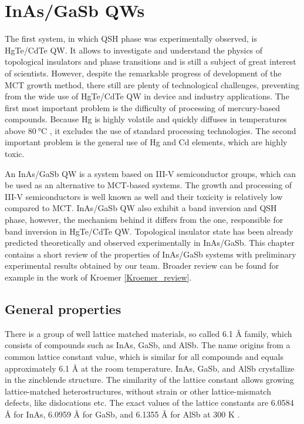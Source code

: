 \documentclass[titlepage,a4paper]{book}
\newcommand{\wciecie}{\quad\phantom{v}}
\begin{document}
\chapter{InAs/GaSb QWs}
\label{Appendix_InAs}
\wciecie
The first system, in which QSH phase was experimentally observed, is HgTe/CdTe QW. It allows to investigate and understand the physics of topological insulators and phase transitions and is still a subject of great interest of scientists. However, despite the remarkable progress of development of the MCT growth method, there still are plenty of technological challenges, preventing from the wide use of HgTe/CdTe QW in device and industry applications. The first most important problem is the difficulty of processing of mercury-based compounds. Because Hg is highly volatile and quickly diffuses in temperatures above $\SI{80}{\degreeCelsius}$ \cite{Daumer_MCT_temperature}, it excludes the use of standard processing technologies. The second important problem is the general use of Hg and Cd elements, which are highly toxic.

An InAs/GaSb QW is a system based on III-V semiconductor groups, which can be used as an alternative to MCT-based systems. The growth and processing of III-V semiconductors is well known as well and their toxicity is relatively low compared to MCT. InAs/GaSb QW also exhibit a band inversion and QSH phase, however, the mechanism behind it differs from the one, responsible for band inversion in HgTe/CdTe QW. Topological insulator state has been already predicted theoretically \cite{Liu_Topology} and observed experimentally \cite{Knez2_State} in InAs/GaSb. This chapter contains a short review of the properties of InAs/GaSb systems with preliminary experimental results obtained by our team. Broader review can be found for example in the work of Kroemer \ref{Kroemer_review}.

\section{General properties}
\wciecie
There is a group of well lattice matched materials, so called 6.1 Å family, which consists of compounds such as InAs, GaSb, and AlSb. The name origins from a common lattice constant value, which is similar for all compounds and equals approximately 6.1 Å at the room temperature. InAs, GaSb, and AlSb crystallize in the zincblende structure. The similarity of the lattice constant allows growing lattice-matched heterostructures, without strain or other lattice-mismatch defects, like dislocations etc. The exact values of the lattice constants are 6.0584 Å for InAs, 6.0959 Å for GaSb, and 6.1355 Å for AlSb at 300 K \cite{Sze}.
\end{document}

